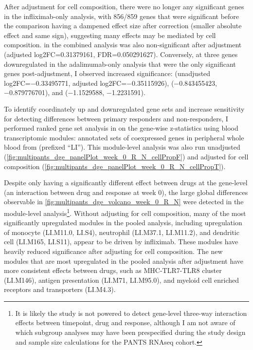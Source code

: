 \begin{outline}
After adjustment for cell composition, there were no longer any significant genes in the infliximab-only analysis, 
with 856/859 genes that were significant before the comparison having a dampened effect size after correction (smaller absolute effect and same sign), suggesting many effects may be mediated by cell composition.
 in the combined analysis was also non-significant after adjustment (adjusted log2FC=\num{0.31379161}, FDR=\num{0.050291627}).
Conversely, at three genes downregulated in the adalimumab-only analysis that were the only significant genes post-adjustment, I observed increased significance:
 (unadjusted log2FC=\num{-0.33495771}, adjusted log2FC=\num{-0.35115926}), 
 (\num{-0.843455423}, \num{-0.879776701}), 
and  (\num{-1.1529588}, \num{-1.2231591}).

To identify coordinately up and downregulated gene sets and increase sensitivity for detecting differences between primary responders and non-responders,
I performed ranked gene set analysis in on the gene-wise z-statistics using blood transcriptomic modules: annotated sets of coexpressed genes in peripheral whole blood from \textcite{li2013MolecularSignaturesAntibody} (prefixed \enquote{LI}).
This module-level analysis was also run unadjusted (\autoref{fig:multipants_dge_panelPlot_week_0_R_N_cellPropF}) and adjusted for cell composition (\autoref{fig:multipants_dge_panelPlot_week_0_R_N_cellPropT}).

Despite only  having a significantly different effect between drugs at the gene-level (an interaction between drug and response at week 0), 
the large global differences observable in \autoref{fig:multipants_dge_volcano_week_0_R_N} were detected in the module-level analysis\footnote{It is likely the study is not powered to detect gene-level three-way interaction effects between timepoint, drug and response, although I am not aware of which subgroup analyses may have been prespecified during the study design and sample size calculations for the \gls{PANTS} \gls{RNAseq} cohort.}.
Without adjusting for cell composition, many of the most significantly upregulated modules in the pooled analysis, 
including upregulation of monocyte (LI.M11.0, LI.S4), neutrophil (LI.M37.1, LI.M11.2), and dendritic cell (LI.M165, LI.S11),
appear to be driven by infliximab.
These modules have heavily reduced significance after adjusting for cell composition.
The new modules that are most upregulated in the pooled analysis after adjustment have more consistent effects between drugs, such as
MHC-TLR7-TLR8 cluster (LI.M146), antigen presentation (LI.M71, LI.M95.0), and myeloid cell enriched receptors and transporters (LI.M4.3).


\end{outline}
